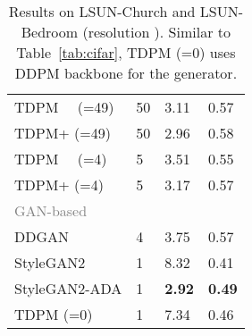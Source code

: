 \documentclass{article} \usepackage{iclr2023_conference,times}
\theoremstyle{plain}
\theoremstyle{definition}
\theoremstyle{remark}
\begin{document}
{\begin{table}[t]
\begin{minipage}[t]{0.48\linewidth}
\begin{tabular}{llll}
TDPM~~ (=49) & 50                      & 3.11                    & 0.57                       \\
TDPM+ (=49) & 50                      & 2.96                    & 0.58                       \\ TDPM~~ (=4)  & 5                       & 3.51                    & 0.55                       \\
TDPM+ (=4)  & 5                       & 3.17                    & 0.57                       \\ \hline
\multicolumn{3}{l}{\textcolor{gray}{GAN-based}} \\
{DDGAN} & {4}                       & {3.75}             & {0.57}      \\
StyleGAN2     & 1                       & 8.32                    & 0.41                       \\
StyleGAN2-ADA & 1                       & \textbf{2.92}                    & \textbf{0.49}                       \\
TDPM (=0)  & 1                       & 7.34                    & 0.46                       \\
\bottomrule[1.5pt]
\end{tabular}
\end{minipage}\hfill
\begin{minipage}[t]{.5\textwidth}
    \centering
\caption{\small Results on LSUN-Church and LSUN-Bedroom (resolution ). Similar to Table~\ref{tab:cifar}, TDPM (=0) uses DDPM backbone for the generator. }
\label{tab:lsun church 256}
\small
\renewcommand{\arraystretch}{1.0}
\end{minipage}
\end{table}}
\end{document}
